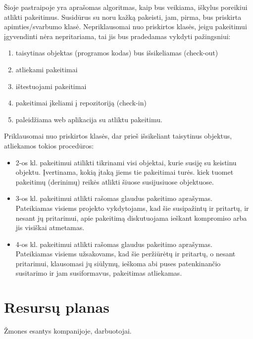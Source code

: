 \documentclass[a4paper,12pt]{article}
\begin{document}
Šioje pastraipoje yra aprašomas algoritmas, kaip bus veikiama, iškylus poreikiui atlikti pakeitimus. 
Susidūrus su noru kažką pakeisti, jam, pirma, bus priskirta apimties/svarbumo klasė. Nepriklausomai nuo priskirtos klasės, jeigu pakeitimui įgyvendinti nėra nepritariama, tai jis bus pradedamas vykdyti pažingsniui: 
\begin{enumerate}
	\item taisytinas objektas (programos kodas) bus išsikeliamas
 (check-out)
 	\item atliekami pakeitimai
 	\item ištestuojami pakeitimai
 	\item pakeitimai įkeliami į repozitoriją (check-in)
 	\item paleidžiama web aplikacija su atliktu pakeitimu.
\end{enumerate}
\clearpage
Priklausomai nuo priskirtos klasės, dar prieš išsikeliant taisytinus objektus, atliekamos tokios procedūros: 
\begin{itemize}
	\item 2-os kl. pakeitimui atilikti tikrinami visi objektai, kurie susiję su keistinu objektu.
		Įvertinama, kokią įtaką jiems tie pakeitimai turės. kiek tuomet pakeitimų (derinimų) reikės atlikti šiuose susijusiuose objektuose.		
	\item 3-os kl. pakeitimui atlikti rašomas glaudus pakeitimo aprašymas.\\
	Pateikiamas visiems projekto vykdytojams, kad šie susipažintų ir pritartų, ir nesant jų pritarimui, apie pakeitimą diskutuojama ieškant kompromiso arba jis visiškai atmetamas.
	\item 4-os kl. pakeitimui atlikti rašomas glaudus pakeitimo aprašymas.\\
	Pateikiamas visiems užsakovams, kad šie peržiūrėtų ir pritartų, o nesant pritarimui, klausomasi jų siūlymų, ieškoma abi puses patenkinančio susitarimo ir jam susiformavus, pakeitimas atliekamas. 
\end{itemize}
 
 \clearpage
 
\section{Resursų planas}



Žmones esantys kompanijoje, darbuotojai.
\end{document}
